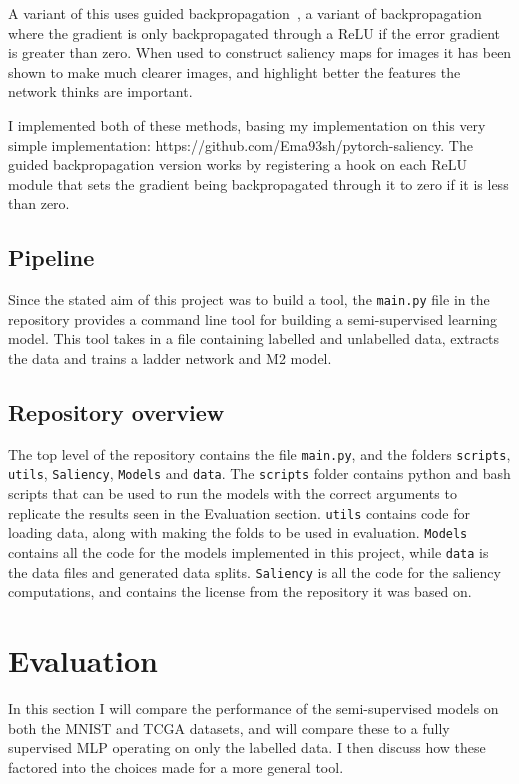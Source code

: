 \documentclass[12pt,a4paper,twoside,openright]{report}
\begin{document}
A variant of this uses guided backpropagation~\cite{DBLP:journals/corr/SpringenbergDBR14}, a variant of backpropagation where the 
gradient is only backpropagated through a ReLU if the error gradient is greater than zero. When used to construct saliency maps for 
images it has been shown to make much clearer images, and highlight better the features the network thinks are important.

I implemented both of these methods, basing my implementation on this very simple implementation: https://github.com/Ema93sh/pytorch-saliency.
The guided backpropagation version works by registering a hook on each ReLU module that sets the gradient being backpropagated through it 
to zero if it is less than zero.

\section{Pipeline}

Since the stated aim of this project was to build a tool, the \texttt{main.py} file in the repository provides a command line tool 
for building a semi-supervised learning model. This tool takes in a file containing labelled and unlabelled data, extracts the data 
and trains a ladder network and M2 model.

\section{Repository overview}

The top level of the repository contains the file \texttt{main.py}, and the folders \texttt{scripts}, \texttt{utils}, \texttt{Saliency},
\texttt{Models} and \texttt{data}. The \texttt{scripts} folder contains python and bash scripts that can be used to run the models with the correct 
arguments to replicate the results seen in the Evaluation section. \texttt{utils} contains code for loading data, along with making the 
folds to be used in evaluation.  \texttt{Models} contains all the code for the models implemented in this project, while \texttt{data} 
is the data files and generated data splits. \texttt{Saliency} is all the code for the saliency computations, and contains the license 
from the repository it was based on.

\chapter{Evaluation}
In this section I will compare the performance of the semi-supervised models on both the MNIST and TCGA datasets, and will compare these 
to a fully supervised MLP operating on only the labelled data. I then discuss how these factored into the choices made for a more general
tool.
\end{document}
